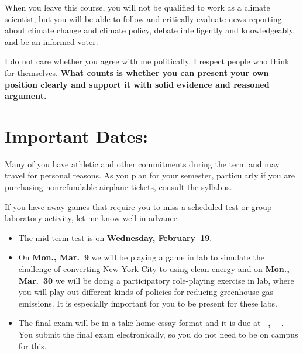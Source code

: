\documentclass[11pt,twoside]{jgsyllabus}\usepackage[]{graphicx}\usepackage[]{color}
\begin{document}
When you leave this course, you will not be qualified to work as a climate scientist, but
you will be able to follow and critically evaluate news
reporting about climate change and climate policy, debate intelligently and knowledgeably,
and be an informed voter.

I do not care whether you agree with me politically.
I respect people who think for themselves.
\textbf{What counts is whether you can present your own position clearly
and support it with solid evidence and reasoned argument.}
%
%
%
\section{Important Dates:}
Many of you have athletic and other commitments during the term and may travel for
personal reasons. As you plan for your semester, particularly if you are purchasing
nonrefundable airplane tickets, consult the syllabus.

If you have away games that require you to miss a scheduled test or group laboratory activity, let me know well in advance.
\begin{itemize}
%
\item The mid-term test is on
\textbf{Wednesday, February~19}.
\item On
\textbf{Mon., Mar.~9}
we will be playing a game in lab to simulate the challenge of converting
New York City to using clean energy and on
\textbf{Mon., Mar.~30}
we will be doing a participatory role-playing
exercise in lab, where you will play out different kinds of policies
for reducing greenhouse gas emissions. It is especially important for you to be
present for these labs.
\item The final exam will be in a take-home essay format and it is due at
\textbf{\TakeHomeExamEndTime~\TakeHomeExamDay, \TakeHomeExamMonth~\TakeHomeExamDate}%
. You submit the final exam electronically, so you do not need to be on campus
for this.
\end{itemize}
%
%
%
%
%
\clearpage
\end{document}
